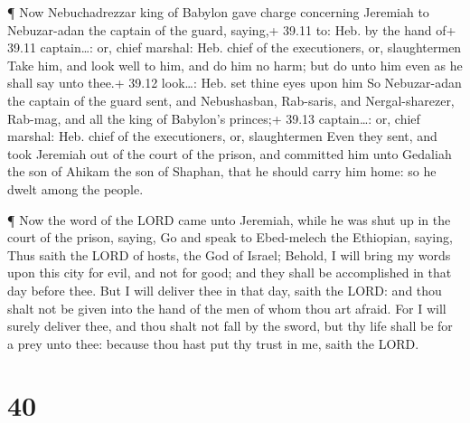  ¶ Now Nebuchadrezzar king of Babylon gave charge
concerning Jeremiah to Nebuzar-adan the captain of the guard, saying,+
39.11 to: Heb. by the hand of+ 39.11 captain\ldots: or, chief marshal:
Heb. chief of the executioners, or, slaughtermen  Take him,
and look well to him, and do him no harm; but do unto him even as he
shall say unto thee.+ 39.12 look\ldots: Heb. set thine eyes upon him
 So Nebuzar-adan the captain of the guard sent, and
Nebushasban, Rab-saris, and Nergal-sharezer, Rab-mag, and all the king
of Babylon's princes;+ 39.13 captain\ldots: or, chief marshal: Heb.
chief of the executioners, or, slaughtermen  Even they
sent, and took Jeremiah out of the court of the prison, and committed
him unto Gedaliah the son of Ahikam the son of Shaphan, that he should
carry him home: so he dwelt among the people.

 ¶ Now the word of the LORD came unto Jeremiah, while he
was shut up in the court of the prison, saying,  Go and
speak to Ebed-melech the Ethiopian, saying, Thus saith the LORD of
hosts, the God of Israel; Behold, I will bring my words upon this city
for evil, and not for good; and they shall be accomplished in that day
before thee.  But I will deliver thee in that day, saith
the LORD: and thou shalt not be given into the hand of the men of whom
thou art afraid.  For I will surely deliver thee, and thou
shalt not fall by the sword, but thy life shall be for a prey unto thee:
because thou hast put thy trust in me, saith the LORD.

\hypertarget{section-39}{%
\section{40}\label{section-39}}

